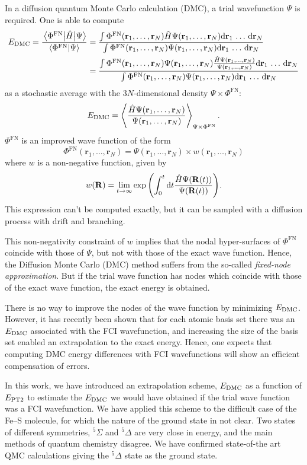 \documentclass[./thesis.tex]{subfiles}
\begin{document}
\newcommand{\rn}{\mathbf{r}_1,\dots,\mathbf{r}_N}
\newcommand{\drn}{\text{d}\mathbf{r}_1\,\dots\,\text{d}\mathbf{r}_N}
In a diffusion quantum Monte Carlo calculation (DMC), a trial wavefunction
$\Psi$ is required. One is able to compute
\begin{align}
  \EDMC = \frac{\Hij{\Phi^{\text{FN}}}{\Psi}}{\braket{\Phi^{\text{FN}}}{\Psi}} & = 
  \frac{\int \Phi^{\text{FN}}(\rn) {\hat H}\Psi(\rn) \drn}{\int \Phi^{\text{FN}}(\rn)\Psi(\rn) \drn} \\
  & = \frac{\int \Phi^{\text{FN}}(\rn)\Psi(\rn) \frac{{\hat H}\Psi(\rn)}{\Psi(\rn)} \drn}{\int \Phi^{\text{FN}}(\rn)\Psi(\rn) \drn} 
\end{align}
as a stochastic average with the $3N$-dimensional density $\Psi \times \Phi^{\text{FN}}$:
\begin{equation}
  \EDMC = \left \langle \frac{{\hat H}\Psi(\rn)}{\Psi(\rn)} \right \rangle_{\Psi \times \Phi^{\text{FN}}}.
\end{equation}
$\Phi^{\text{FN}}$ is an improved wave function of the form
\begin{equation}
\Phi^{\text{FN}}(\rn)  = \Psi(\rn) \times w (\rn)
\end{equation}
where $w$ is a non-negative function, given by
\begin{equation}
w(\mathbf{R}) = \lim_{t \rightarrow \infty} \exp \qty( \int_0^t \text{d}t \frac{{\hat H}\Psi(\mathbf{R}(t))}{\Psi(\mathbf{R}(t))} ).
\end{equation}
This expression can't be computed exactly, but it can be sampled with a diffusion
process with drift and branching.\cite{Hammond_1994}

This non-negativity constraint of $w$ implies that the nodal
hyper-surfaces of $\Phi^{\text{FN}}$ coincide with those of $\Psi$, but not with
those of the exact wave function. Hence, the Diffusion Monte Carlo (DMC) method
suffers from the so-called \emph{fixed-node approximation}. But if the trial wave
function has nodes which coincide with those of the exact wave function, the
exact energy is obtained.

There is no way to improve the nodes of the wave function by minimizing $E_\text{DMC}$.
However, it has recently been shown\cite{Caffarel_2016} that for each atomic basis
set there was an $E_\text{DMC}$ associated with the FCI wavefunction, and increasing the
size of the basis set enabled an extrapolation to the exact energy.
Hence, one expects that computing DMC energy differences with FCI wavefunctions will
show an efficient compensation of errors.

In this work, we have introduced an extrapolation scheme, $E_\text{DMC}$ as a function
of $E_\text{PT2}$ to estimate the $E_\text{DMC}$ we would have obtained if the trial wave
function was a FCI wavefunction. We have applied this scheme to the difficult
case of the Fe--S molecule, for which the nature of the ground state in not
clear. Two states of different symmetries, $^5\Sigma$ and $^5\Delta$ are very
close in energy, and the main methods of quantum chemistry disagree.
We have confirmed state-of-the art QMC calculations giving the $^5\Delta$ state
as the ground state.\cite{Haghighi_Mood_2017}



\end{document}
